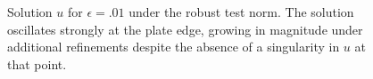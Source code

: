 \begin{figure}[!h]
\centering
{}
\caption{Solution $u$ for $\epsilon = .01$ under the robust test norm.  The solution oscillates strongly at the plate edge, growing in magnitude under additional refinements despite the absence of a singularity in $u$ at that point.}
\label{fig:plateOsc}
\end{figure}

